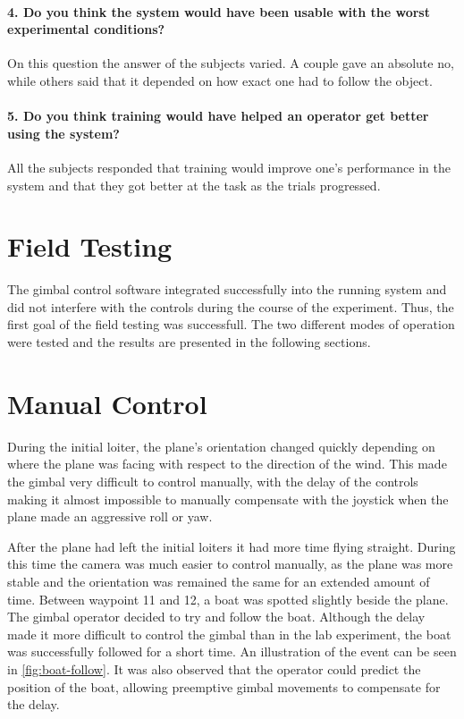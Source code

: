 \documentclass[nofilelist]{cslthse-msc}
\begin{document}
\paragraph{4. Do you think the system would have been usable with the worst experimental conditions?}
On this question the answer of the subjects varied. A couple gave an absolute no, while others said that it depended on how exact one had to follow the object. 

\paragraph{5. Do you think training would have helped an operator get better using the system?}
All the subjects responded that training would improve one's performance in the system and that they got better at the task as the trials progressed. 

\section{Field Testing}
The gimbal control software integrated successfully into the running system and did not interfere with the controls during the course of the experiment. Thus, the first goal of the field testing was successfull.
The two different modes of operation were tested and the results are presented in the following sections.

\section{Manual Control}
During the initial loiter, the plane's orientation changed quickly depending on where the plane was facing with respect to the direction of the wind. This made the gimbal very difficult to control manually, with the delay of the controls making it almost impossible to manually compensate with the joystick when the plane made an aggressive roll or yaw.

After the plane had left the initial loiters it had more time flying straight. During this time the camera was much easier to control manually, as the plane was more stable and the orientation was remained the same for an extended amount of time. 
Between waypoint 11 and 12, a boat was spotted slightly beside the plane. The gimbal operator decided to try and follow the boat. Although the delay made it more difficult to control the gimbal than in the lab experiment, the boat was successfully followed for a short time. An illustration of the event can be seen in \ref{fig:boat-follow}. It was also observed that the operator could predict the position of the boat, allowing preemptive gimbal movements to compensate for the delay. 
\end{document}
